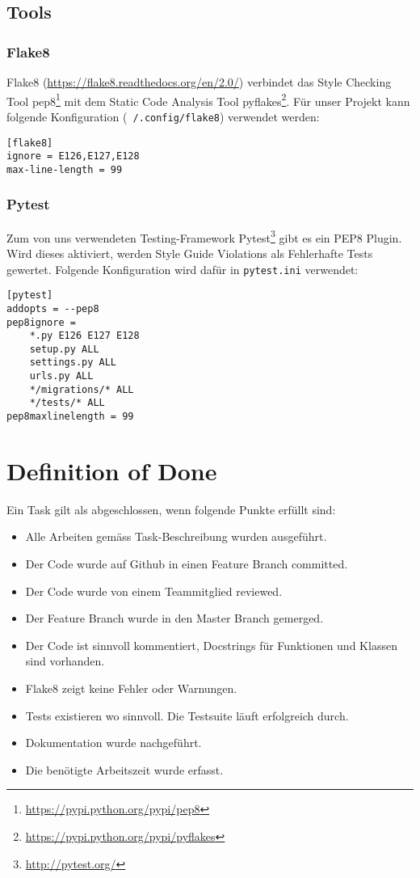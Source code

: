 \documentclass{article}
\begin{document}
\subsection{Tools}

\subsubsection{Flake8}

Flake8 (\url{https://flake8.readthedocs.org/en/2.0/}) verbindet das Style
Checking Tool pep8\footnote{\url{https://pypi.python.org/pypi/pep8}} mit dem
Static Code Analysis Tool
pyflakes\footnote{\url{https://pypi.python.org/pypi/pyflakes}}. Für unser
Projekt kann folgende Konfiguration (\texttt{~/.config/flake8}) verwendet
werden:

\begin{verbatim}
[flake8]
ignore = E126,E127,E128
max-line-length = 99
\end{verbatim}

\subsubsection{Pytest}

Zum von uns verwendeten Testing-Framework
Pytest\footnote{\url{http://pytest.org/}} gibt es ein PEP8 Plugin. Wird dieses
aktiviert, werden Style Guide Violations als Fehlerhafte Tests gewertet.
Folgende Konfiguration wird dafür in \texttt{pytest.ini} verwendet:

\begin{verbatim}
[pytest]
addopts = --pep8
pep8ignore =
    *.py E126 E127 E128
    setup.py ALL
    settings.py ALL
    urls.py ALL
    */migrations/* ALL
    */tests/* ALL
pep8maxlinelength = 99
\end{verbatim}


\section{Definition of Done}

Ein Task gilt als abgeschlossen, wenn folgende Punkte erfüllt sind:

\begin{itemize}
	\item Alle Arbeiten gemäss Task-Beschreibung wurden ausgeführt.
	\item Der Code wurde auf Github in einen Feature Branch committed.
	\item Der Code wurde von einem Teammitglied reviewed.
	\item Der Feature Branch wurde in den Master Branch gemerged.
	\item Der Code ist sinnvoll kommentiert, Docstrings für Funktionen und Klassen sind vorhanden.
	\item Flake8 zeigt keine Fehler oder Warnungen.
	\item Tests existieren wo sinnvoll. Die Testsuite läuft erfolgreich durch.
	\item Dokumentation wurde nachgeführt.
	\item Die benötigte Arbeitszeit wurde erfasst.
\end{itemize}
\end{document}
